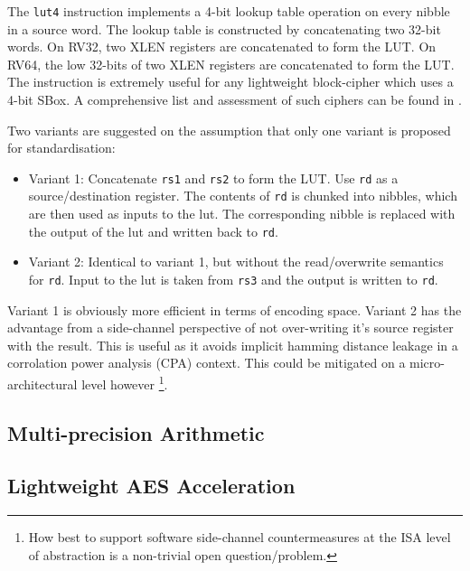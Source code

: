 The {\tt lut4} instruction implements a 4-bit lookup table operation
on every nibble in a source word.
The lookup table is constructed by concatenating two 32-bit words.
On RV32, two XLEN registers are concatenated to form the LUT.
On RV64, the low 32-bits of two XLEN registers are concatenated to form
the LUT.
The instruction is extremely useful for any lightweight block-cipher
which uses a 4-bit SBox.
A comprehensive list and assessment of such ciphers can be found
in \cite{TGMGD:19}.

Two variants are suggested on the assumption that only one variant is
proposed for standardisation:
\begin{itemize}
\item Variant 1: Concatenate {\tt rs1} and {\tt rs2} to form the LUT.
    Use {\tt rd} as a source/destination register.
    The contents of {\tt rd} is chunked into nibbles, which are then
    used as inputs to the lut. The corresponding nibble is replaced
    with the output of the lut and written back to {\tt rd}.
\item Variant 2: Identical to variant 1, but without the read/overwrite
    semantics for {\tt rd}. Input to the lut is taken from {\tt rs3}
    and the output is written to {\tt rd}.
\end{itemize}
Variant 1 is obviously more efficient in terms of encoding space.
Variant 2 has the advantage from a side-channel perspective
of not over-writing it's source register with the result.
This is useful as it avoids implicit hamming distance leakage in
a corrolation power analysis (CPA) context. This could be mitigated
on a micro-architectural level however
\footnote{
    How best to support software side-channel countermeasures at the
    ISA level of abstraction is a non-trivial open question/problem.
}.


\subsection{Multi-precision Arithmetic}

\todo{}


\subsection{Lightweight AES Acceleration}

